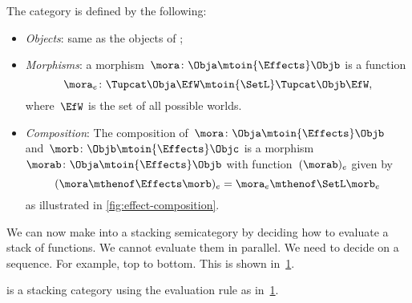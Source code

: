\begin{definition}
    The \Effects category is defined by the following:
    \begin{itemize}
        \item \emph{Objects}: same as the objects of \SetL;
        \item \emph{Morphisms}: a morphism~$\mora\colon \Obja \mtoin{\Effects} \Objb$ is a function
              \begin{equation}
                  \mora_e\colon \Tupcat \Obja \EfW \mtoin{\SetL} \Tupcat \Objb \EfW,
              \end{equation}
              where~$\EfW$ is the set of all possible worlds.
        \item \emph{Composition}: The composition of~$\mora\colon \Obja \mtoin{\Effects} \Objb$ and~$\morb\colon \Objb \mtoin{\Effects} \Objc$ is a morphism~$\morab\colon \Obja \mtoin{\Effects} \Objb$ with function~$(\morab)_e$ given by
              \begin{equation}
                  (\mora \mthenof \Effects \morb)
                  _e = \mora_e \mthenof\SetL \morb_e
              \end{equation}
              as illustrated in \cref{fig:effect-composition}.
    \end{itemize}
\end{definition}

We can now make \Effects into a stacking semicategory by deciding how to evaluate a stack of functions.
We cannot evaluate them in parallel.
We need to decide on a sequence.
For example, top to bottom.
This is shown in~\cref{fig:effect-stacking}.

\begin{lemma}
    \label{lem:effects-is-stacking}
    \Effects is a stacking category using the evaluation rule as in~\cref{fig:effect-stacking}.
\end{lemma}

\begin{figure}[h!]
    \centering
    \caption{}
    \label{fig:effect-stacking}
\end{figure}


